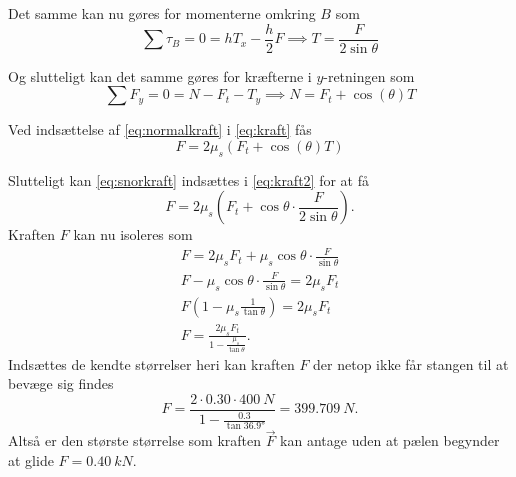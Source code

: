 \documentclass[12pt]{article}
\theoremstyle{definition}
\begin{document}
Det samme kan nu gøres for momenterne omkring $B$ som
\begin{equation} \label{eq:snorkraft}
\sum \tau_B = 0 = h T_x - \frac{h}{2}F \implies T = \frac{F}{2 \sin\theta}
\end{equation}

Og slutteligt kan det samme gøres for kræfterne i $y$-retningen som
\begin{equation} \label{eq:normalkraft}
  \sum F_y = 0 = N - F_t - T_y \implies N = F_t + \cos (\theta) T
\end{equation} 

Ved indsættelse af \autoref{eq:normalkraft} i \autoref{eq:kraft} fås
\begin{equation} \label{eq:kraft2}
  F = 2 \mu_s \left( F_t + \cos(\theta) T \right)
\end{equation}

Slutteligt kan \autoref{eq:snorkraft} indsættes i \autoref{eq:kraft2} for at få
\[ 
  F = 2 \mu_s \left( F_t + \cos \theta \cdot \frac{F}{2 \sin \theta} \right)
.\]
Kraften $F$ kan nu isoleres som
\begin{gather*}
  F = 2\mu_s F_t + \mu_s \cos \theta \cdot \frac{F}{\sin\theta} \\
  F - \mu_s \cos \theta \cdot \frac{F}{\sin \theta} = 2\mu_s F_t \\
  F \left( 1 - \mu_s \frac{1}{\tan\theta} \right) = 2\mu_s F_t \\
  F = \frac{2\mu_s F_t}{1 - \frac{\mu_s}{\tan \theta}}
.\end{gather*}
Indsættes de kendte størrelser heri kan kraften $F$ der netop ikke får stangen til at bevæge sig findes
\[ 
F = \frac{2 \cdot \num{0,30} \cdot \qty{400}{N}}{1 - \frac{\num{0,3}}{\tan \ang{36,9}}} = \qty{399,709}{N} 
.\]
Altså er den største størrelse som kraften $\Vec{F}$ kan antage uden at pælen begynder at glide \underline{\underline{$F = \qty{0,40}{kN}$}}.
\end{document}
